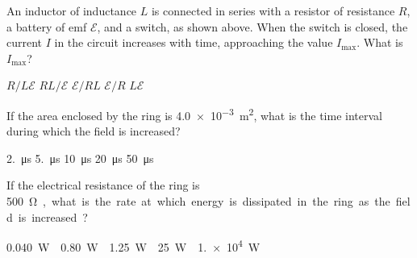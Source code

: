 \documentclass[12pt]{../oss-classkick-exam}
\begin{document}
\begin{questions}
  \question An inductor of inductance $L$ is connected in series with a
  resistor of resistance $R$, a battery of emf $\mathcal E$, and a switch, as
  shown above. When the switch is closed, the current $I$ in the circuit
  increases with time, approaching the value $I_\text{max}$. What is
  $I_\text{max}$?
  
  \begin{minipage}{.4\textwidth}
  \end{minipage}
  \begin{minipage}{.4\linewidth}
    \begin{choices}
      \choice $R/L\mathcal E$
      \choice $RL/\mathcal E$
      \choice $\mathcal E/RL$
      \choice $\mathcal E/R$
      \choice $L\mathcal E$
    \end{choices}
  \end{minipage}
  
  
  
  \question If the area enclosed by the ring is \SI{4.0e-3}{\metre\squared},
  what is the time interval during which the field is increased?
  \label{emf1}
  \begin{choices}
    \choice \SI{2.}{\micro\second}
    \choice \SI{5.}{\micro\second}
    \choice \SI{10}{\micro\second}
    \choice \SI{20}{\micro\second}
    \choice \SI{50}{\micro\second}
  \end{choices}

  \question If the electrical resistance of the ring is \SI{500}\ohm, what is
  the rate at which energy is dissipated in the ring as the field is increased?
  \label{emf2}
  \begin{choices}
    \choice\SI{.040}\watt
    \choice\SI{.80}\watt
    \choice\SI{1.25}\watt
    \choice\SI{25}\watt
    \choice\SI{1.e4}\watt
  \end{choices}


\end{questions}
\end{document}

